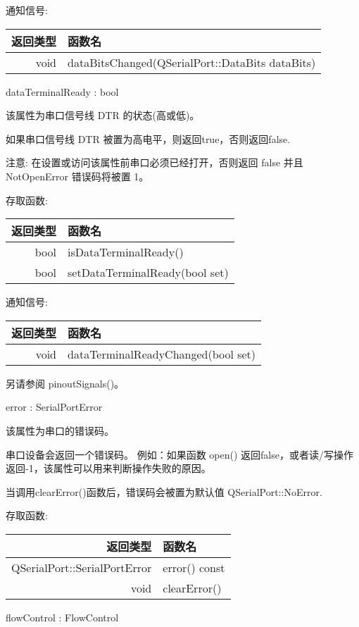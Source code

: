通知信号:

\begin{tabular}{|r|l|}
	\hline
	返回类型  &	函数名 \\ 
	\hline
	void 	& dataBitsChanged(QSerialPort::DataBits dataBits) \\ 
	\hline
\end{tabular}

dataTerminalReady : bool

该属性为串口信号线 DTR 的状态(高或低)。

如果串口信号线 DTR 被置为高电平，则返回true，否则返回false.

注意: 在设置或访问该属性前串口必须已经打开，否则返回 false 并且 NotOpenError 错误码将被置 1。

存取函数:

\begin{tabular}{|r|l|}
\hline
返回类型  &	函数名 \\ 
\hline
bool &	isDataTerminalReady() \\ 
\hline
bool &	setDataTerminalReady(bool set) \\ 
\hline
\end{tabular}
 
通知信号:

\begin{tabular}{|r|l|}
	\hline
	返回类型  &	函数名 \\ 
	\hline
	void 	& dataTerminalReadyChanged(bool set) \\ 
	\hline
\end{tabular}

另请参阅 pinoutSignals()。

error : SerialPortError

该属性为串口的错误码。

串口设备会返回一个错误码。
例如：如果函数 open() 返回false，或者读/写操作返回-1，该属性可以用来判断操作失败的原因。

当调用clearError()函数后，错误码会被置为默认值 QSerialPort::NoError.

存取函数:

\begin{tabular}{|r|l|}
	\hline
	返回类型  &	函数名 \\ 
	\hline
	QSerialPort::SerialPortError 	&error() const \\ 
	\hline
void 	&clearError() \\ 
	\hline
\end{tabular}



flowControl : FlowControl

